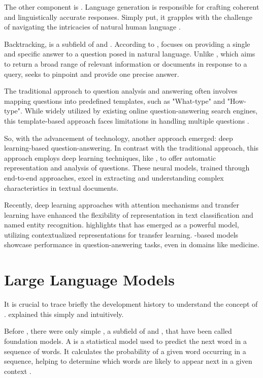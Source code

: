 The other component is \textbf{{\nlg}}. Language generation is responsible for crafting coherent and linguistically accurate responses. Simply put, it grapples with the challenge of navigating the intricacies of natural human language \cite{ngai_intelligent_2021}. 

Backtracking, {\qa} is a subfield of {\ir} and {\nlp}. According to \citet{zhong_building_2020}, {\qa} focuses on providing a single and specific answer to a question posed in natural language. Unlike {\ir}, which aims to return a broad range of relevant information or documents in response to a query, {\qa} seeks to pinpoint and provide one precise answer.

The traditional approach to question analysis and answering often involves mapping questions into predefined templates, such as "What-type" and "How-type". While widely utilized by existing online question-answering search engines, this template-based approach faces limitations in handling multiple questions \cite{zhong_building_2020}. 

So, with the advancement of technology, another approach emerged: deep learning-based question-answering. In contrast with the traditional approach, this approach employs deep learning techniques, like {\rnn}, to offer automatic representation and analysis of questions. These neural models, trained through end-to-end approaches, excel in extracting and understanding complex characteristics in textual documents.

Recently, deep learning approaches with attention mechanisms and transfer learning have enhanced the flexibility of representation in text classification and named entity recognition. \citet{zhong_building_2020} highlights {\bert} that has emerged as a powerful model, utilizing contextualized representations for transfer learning. {\bert}-based models showcase performance in question-answering tasks, even in domains like medicine.



\section{Large Language Models}
\label{llm}

It is crucial to trace briefly the development history to understand the concept of {\llm}. \citet{liu_prompting_nodate} explained this simply and intuitively.

Before {\llm}, there were only simple {\lm}, a subfield of {\nlp} and {\ai}, that have been called foundation models. A {\lm} is a statistical model used to predict the next word in a sequence of words. It calculates the probability of a given word occurring in a sequence, helping to determine which words are likely to appear next in a given context \cite{chang_language_2023}.

